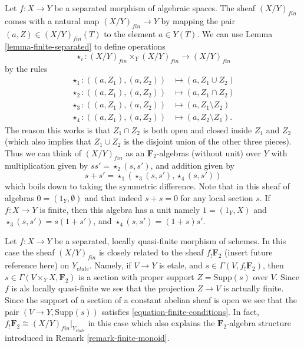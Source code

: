 \begin{remark}
\label{remark-finite-monoid}
Let $f : X \to Y$ be a separated morphism of algebraic spaces.
The sheaf $(X/Y)_{fin}$ comes with a natural map
$(X/Y)_{fin} \to Y$ by mapping the pair $(a, Z) \in (X/Y)_{fin}(T)$
to the element $a \in Y(T)$. We can use
Lemma \ref{lemma-finite-separated}
to define operations
$$
\star_i : (X/Y)_{fin} \times_Y (X/Y)_{fin} \longrightarrow (X/Y)_{fin}
$$
by the rules
\begin{align*}
\star_1 : ((a, Z_1), (a, Z_2)) & \longmapsto (a, Z_1 \cup Z_2) \\
\star_2 : ((a, Z_1), (a, Z_2)) & \longmapsto (a, Z_1 \cap Z_2) \\
\star_3 : ((a, Z_1), (a, Z_2)) & \longmapsto (a, Z_1 \setminus Z_2) \\
\star_4 : ((a, Z_1), (a, Z_2)) & \longmapsto (a, Z_2 \setminus Z_1).
\end{align*}
The reason this works is that $Z_1 \cap Z_2$ is both open and closed
inside $Z_1$ and $Z_2$ (which also implies that $Z_1 \cup Z_2$ is
the disjoint union of the other three pieces).
Thus we can think of $(X/Y)_{fin}$ as an $\mathbf{F}_2$-algebras
(without unit) over $Y$ with multiplication given by
$ss' = \star_2(s, s')$, and addition given by
$$
s + s' = \star_1(\star_3(s, s'), \star_4(s, s'))
$$
which boils down to taking the symmetric difference.
Note that in this sheaf of algebras $0 = (1_Y, \emptyset)$
and that indeed $s + s = 0$ for any local section $s$.
If $f : X \to Y$ is finite, then this algebra has a unit namely
$1 = (1_Y, X)$ and $\star_3(s, s') = s(1 + s')$, and
$\star_4(s, s') = (1 + s)s'$.
\end{remark}

\begin{remark}
\label{remark-finite-quasi-finite-separated-morphism-schemes}
Let $f : X \to Y$ be a separated, locally quasi-finite
morphism of schemes. In this case the sheaf $(X/Y)_{fin}$
is closely related to the sheaf $f_!\mathbf{F}_2$
(insert future reference here) on $Y_{etale}$.
Namely, if $V \to Y$ is etale, and $s \in \Gamma(V, f_!\mathbf{F}_2)$,
then $s \in \Gamma(V \times_Y X, \mathbf{F}_2)$ is a section
with proper support $Z = \text{Supp}(s)$ over $V$. Since $f$ is
als locally quasi-finite we see that the projection $Z \to V$ is actually
finite. Since the support of a section of a constant abelian sheaf is open
we see that the pair $(V \to Y, \text{Supp}(s))$ satisfies
\ref{equation-finite-conditions}.
In fact, $f_!\mathbf{F}_2 \cong (X/Y)_{fin}|_{Y_{etale}}$
in this case which also explains the $\mathbf{F}_2$-algebra structure
introduced in Remark \ref{remark-finite-monoid}.
\end{remark}

